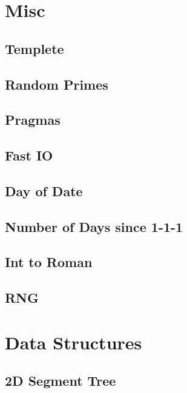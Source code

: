 \section{Misc}
\subsection{Templete}

\subsection{Random Primes}

\subsection{Pragmas}

\subsection{Fast IO}

\subsection{Day of Date}

\subsection{Number of Days since 1-1-1}

\subsection{Int to Roman}

\subsection{RNG}

\section{Data Structures}
\subsection{2D Segment Tree}

